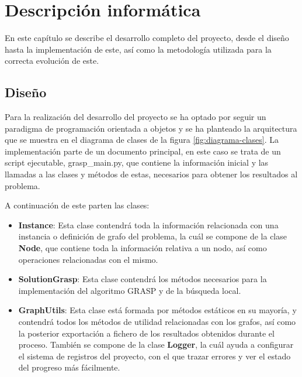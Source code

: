 
\chapter{Descripción informática} %

\label{Chapter4} %


En este capítulo se describe el desarrollo completo del proyecto, desde el diseño hasta la implementación de este, así como la metodología utilizada para la correcta evolución de este.

\section{Diseño}
Para la realización del desarrollo del proyecto se ha optado por seguir un paradigma de programación orientada a objetos y se ha planteado la arquitectura que se muestra en el diagrama de clases de la figura \ref{fig:diagrama-clases}.
La implementación parte de un documento principal, en este caso se trata de un script ejecutable, grasp\_main.py, que contiene la información inicial y las llamadas a las clases y métodos de estas, necesarios para obtener los resultados al problema.

A continuación de este parten las clases:
 \begin{itemize}
	\item \textbf{Instance}: Esta clase contendrá toda la información relacionada con una instancia o definición de grafo del problema, la cuál se compone de la clase \textbf{Node}, que contiene toda la información relativa a un nodo, así como operaciones relacionadas con el mismo.
	\item \textbf{SolutionGrasp}: Esta clase contendrá los métodos necesarios para la implementación del algoritmo \gls{GRASP} y de la búsqueda local.
	\item \textbf{GraphUtils}: Esta clase está formada por métodos estáticos en su mayoría, y contendrá todos los métodos de utilidad relacionadas con los grafos, así como la posterior exportación a fichero de los resultados obtenidos durante el proceso. También se compone de la clase \textbf{Logger}, la cuál ayuda a configurar el sistema de registros del proyecto, con el que trazar errores y ver el estado del progreso más fácilmente.
\end{itemize}

